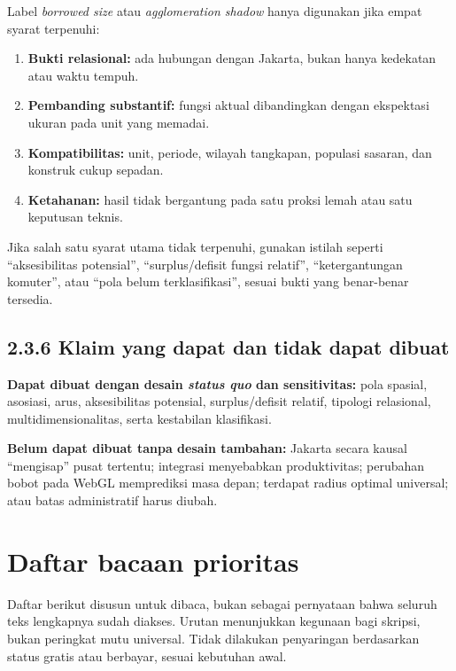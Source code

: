\documentclass[
  indonesian,
  11pt,
  a4paper,
  oneside,
  openany]{report}
\providecommand{\tightlist}{%
  \setlength{\itemsep}{0pt}\setlength{\parskip}{0pt}}
\begin{document}
Label \emph{borrowed size} atau \emph{agglomeration shadow} hanya
digunakan jika empat syarat terpenuhi:

\begin{enumerate}
\def\labelenumi{\arabic{enumi}.}
\tightlist
\item
  \textbf{Bukti relasional:} ada hubungan dengan Jakarta, bukan hanya
  kedekatan atau waktu tempuh.
\item
  \textbf{Pembanding substantif:} fungsi aktual dibandingkan dengan
  ekspektasi ukuran pada unit yang memadai.
\item
  \textbf{Kompatibilitas:} unit, periode, wilayah tangkapan, populasi
  sasaran, dan konstruk cukup sepadan.
\item
  \textbf{Ketahanan:} hasil tidak bergantung pada satu proksi lemah atau
  satu keputusan teknis.
\end{enumerate}

Jika salah satu syarat utama tidak terpenuhi, gunakan istilah seperti
``aksesibilitas potensial'', ``surplus/defisit fungsi relatif'',
``ketergantungan komuter'', atau ``pola belum terklasifikasi'', sesuai
bukti yang benar-benar tersedia.

\subsection{2.3.6 Klaim yang dapat dan tidak dapat
dibuat}\label{klaim-yang-dapat-dan-tidak-dapat-dibuat}

\textbf{Dapat dibuat dengan desain \emph{status quo} dan sensitivitas:}
pola spasial, asosiasi, arus, aksesibilitas potensial, surplus/defisit
relatif, tipologi relasional, multidimensionalitas, serta kestabilan
klasifikasi.

\textbf{Belum dapat dibuat tanpa desain tambahan:} Jakarta secara kausal
``mengisap'' pusat tertentu; integrasi menyebabkan produktivitas;
perubahan bobot pada WebGL memprediksi masa depan; terdapat radius
optimal universal; atau batas administratif harus diubah.

\section{Daftar bacaan prioritas}\label{daftar-bacaan-prioritas}

Daftar berikut disusun untuk dibaca, bukan sebagai pernyataan bahwa
seluruh teks lengkapnya sudah diakses. Urutan menunjukkan kegunaan bagi
skripsi, bukan peringkat mutu universal. Tidak dilakukan penyaringan
berdasarkan status gratis atau berbayar, sesuai kebutuhan awal.
\end{document}
